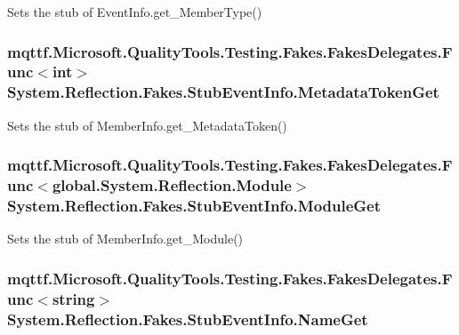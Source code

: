 Sets the stub of Event\-Info.\-get\-\_\-\-Member\-Type()

\hypertarget{class_system_1_1_reflection_1_1_fakes_1_1_stub_event_info_aa831e3ce342f746badd04320e8eedd17}{
\subsubsection[{Metadata\-Token\-Get}]{\setlength{\rightskip}{0pt plus 5cm}mqttf.\-Microsoft.\-Quality\-Tools.\-Testing.\-Fakes.\-Fakes\-Delegates.\-Func$<$int$>$ System.\-Reflection.\-Fakes.\-Stub\-Event\-Info.\-Metadata\-Token\-Get}}\label{class_system_1_1_reflection_1_1_fakes_1_1_stub_event_info_aa831e3ce342f746badd04320e8eedd17}


Sets the stub of Member\-Info.\-get\-\_\-\-Metadata\-Token()

\hypertarget{class_system_1_1_reflection_1_1_fakes_1_1_stub_event_info_a2472a6a60a4b5906ddc430d99df55227}{
\subsubsection[{Module\-Get}]{\setlength{\rightskip}{0pt plus 5cm}mqttf.\-Microsoft.\-Quality\-Tools.\-Testing.\-Fakes.\-Fakes\-Delegates.\-Func$<$global.\-System.\-Reflection.\-Module$>$ System.\-Reflection.\-Fakes.\-Stub\-Event\-Info.\-Module\-Get}}\label{class_system_1_1_reflection_1_1_fakes_1_1_stub_event_info_a2472a6a60a4b5906ddc430d99df55227}


Sets the stub of Member\-Info.\-get\-\_\-\-Module()

\hypertarget{class_system_1_1_reflection_1_1_fakes_1_1_stub_event_info_a381ceb7f1a9cfa2da59c191007045edf}{
\subsubsection[{Name\-Get}]{\setlength{\rightskip}{0pt plus 5cm}mqttf.\-Microsoft.\-Quality\-Tools.\-Testing.\-Fakes.\-Fakes\-Delegates.\-Func$<$string$>$ System.\-Reflection.\-Fakes.\-Stub\-Event\-Info.\-Name\-Get}}\label{class_system_1_1_reflection_1_1_fakes_1_1_stub_event_info_a381ceb7f1a9cfa2da59c191007045edf}


